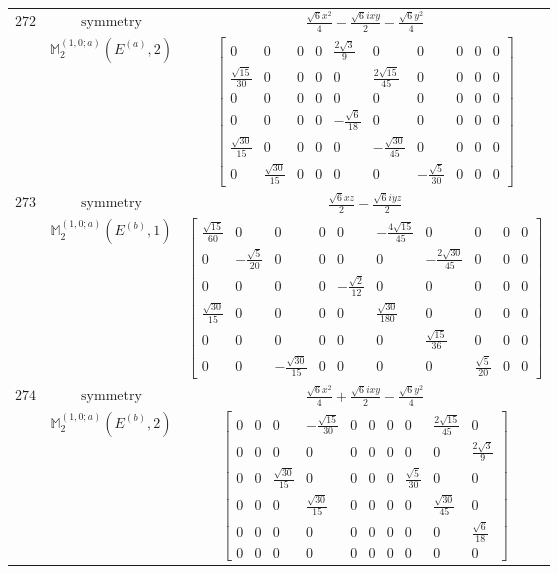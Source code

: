 \documentclass[fleqn,8pt,landscape]{jsarticle}
\begin{document}
\begin{longtable}{ccc}
$ 272 $ & $ \text{symmetry} $ & $ \frac{\sqrt{6} x^{2}}{4} - \frac{\sqrt{6} i x y}{2} - \frac{\sqrt{6} y^{2}}{4} $ \\
$  $ & $ \mathbb{M}_{2}^{(1,0;a)}(E^{(a)},2) $ & $ \begin{bmatrix} 0 & 0 & 0 & 0 & \frac{2 \sqrt{3}}{9} & 0 & 0 & 0 & 0 & 0 \\ \frac{\sqrt{15}}{30} & 0 & 0 & 0 & 0 & \frac{2 \sqrt{15}}{45} & 0 & 0 & 0 & 0 \\ 0 & 0 & 0 & 0 & 0 & 0 & 0 & 0 & 0 & 0 \\ 0 & 0 & 0 & 0 & - \frac{\sqrt{6}}{18} & 0 & 0 & 0 & 0 & 0 \\ \frac{\sqrt{30}}{15} & 0 & 0 & 0 & 0 & - \frac{\sqrt{30}}{45} & 0 & 0 & 0 & 0 \\ 0 & \frac{\sqrt{30}}{15} & 0 & 0 & 0 & 0 & - \frac{\sqrt{5}}{30} & 0 & 0 & 0 \end{bmatrix} $ \\ \hline
$ 273 $ & $ \text{symmetry} $ & $ \frac{\sqrt{6} x z}{2} - \frac{\sqrt{6} i y z}{2} $ \\
$  $ & $ \mathbb{M}_{2}^{(1,0;a)}(E^{(b)},1) $ & $ \begin{bmatrix} \frac{\sqrt{15}}{60} & 0 & 0 & 0 & 0 & - \frac{4 \sqrt{15}}{45} & 0 & 0 & 0 & 0 \\ 0 & - \frac{\sqrt{5}}{20} & 0 & 0 & 0 & 0 & - \frac{2 \sqrt{30}}{45} & 0 & 0 & 0 \\ 0 & 0 & 0 & 0 & - \frac{\sqrt{2}}{12} & 0 & 0 & 0 & 0 & 0 \\ \frac{\sqrt{30}}{15} & 0 & 0 & 0 & 0 & \frac{\sqrt{30}}{180} & 0 & 0 & 0 & 0 \\ 0 & 0 & 0 & 0 & 0 & 0 & \frac{\sqrt{15}}{36} & 0 & 0 & 0 \\ 0 & 0 & - \frac{\sqrt{30}}{15} & 0 & 0 & 0 & 0 & \frac{\sqrt{5}}{20} & 0 & 0 \end{bmatrix} $ \\ \hline
$ 274 $ & $ \text{symmetry} $ & $ \frac{\sqrt{6} x^{2}}{4} + \frac{\sqrt{6} i x y}{2} - \frac{\sqrt{6} y^{2}}{4} $ \\
$  $ & $ \mathbb{M}_{2}^{(1,0;a)}(E^{(b)},2) $ & $ \begin{bmatrix} 0 & 0 & 0 & - \frac{\sqrt{15}}{30} & 0 & 0 & 0 & 0 & \frac{2 \sqrt{15}}{45} & 0 \\ 0 & 0 & 0 & 0 & 0 & 0 & 0 & 0 & 0 & \frac{2 \sqrt{3}}{9} \\ 0 & 0 & \frac{\sqrt{30}}{15} & 0 & 0 & 0 & 0 & \frac{\sqrt{5}}{30} & 0 & 0 \\ 0 & 0 & 0 & \frac{\sqrt{30}}{15} & 0 & 0 & 0 & 0 & \frac{\sqrt{30}}{45} & 0 \\ 0 & 0 & 0 & 0 & 0 & 0 & 0 & 0 & 0 & \frac{\sqrt{6}}{18} \\ 0 & 0 & 0 & 0 & 0 & 0 & 0 & 0 & 0 & 0 \end{bmatrix} $ \\ \hline

\end{longtable}
\end{document}
